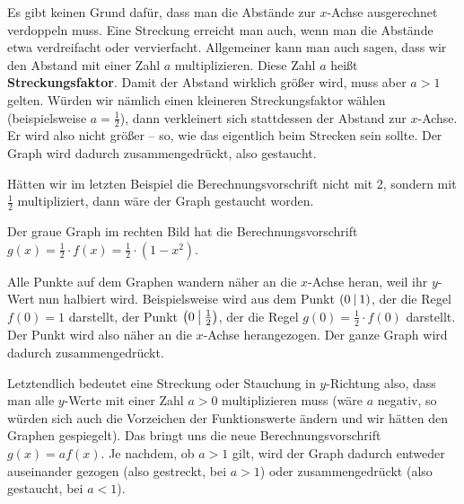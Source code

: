 \documentclass[../../main.tex]{subfiles}
\begin{document}
Es gibt keinen Grund dafür, dass man die Abstände zur $x$-Achse ausgerechnet verdoppeln muss. Eine Streckung erreicht man auch, wenn man die Abstände etwa verdreifacht oder vervierfacht. Allgemeiner kann man auch sagen, dass wir den Abstand mit einer Zahl $a$ multiplizieren. Diese Zahl $a$ heißt \textbf{Streckungsfaktor}. Damit der Abstand wirklich größer wird, muss aber $a>1$ gelten. Würden wir nämlich einen kleineren Streckungsfaktor wählen (beispielsweise $a=\frac{1}{2}$), dann verkleinert sich stattdessen der Abstand zur $x$-Achse. Er wird also nicht größer -- so, wie das eigentlich beim Strecken sein sollte. Der Graph wird dadurch zusammengedrückt, also gestaucht.

\begin{example}{}
    
    Hätten wir im letzten Beispiel die Berechnungsvorschrift nicht mit 2, sondern mit $\frac{1}{2}$ multipliziert, dann wäre der Graph gestaucht worden.
    
    Der graue Graph im rechten Bild hat die Berechnungsvorschrift $g(x)=\frac{1}{2}\cdot f(x)=\frac{1}{2}\cdot (1-x^2)$.
    
    Alle Punkte auf dem Graphen wandern näher an die $x$-Achse heran, weil ihr $y$-Wert nun halbiert wird. 
    Beispielsweise wird aus dem Punkt $\left(0 \:\middle|\: 1\right)$, der die Regel $f(0)=1$ darstellt, der Punkt $\left(0 \:\middle|\: \frac{1}{2}\right)$, der die Regel $g(0)=\frac{1}{2}\cdot f(0)$ darstellt. Der Punkt wird also näher an die $x$-Achse herangezogen. Der ganze Graph wird dadurch zusammengedrückt.
\end{example}

Letztendlich bedeutet eine Streckung oder Stauchung in $y$-Richtung also, dass man alle $y$-Werte mit einer Zahl $a>0$ multiplizieren muss (wäre $a$ negativ, so würden sich auch die Vorzeichen der Funktionswerte ändern und wir hätten den Graphen gespiegelt). Das bringt uns die neue Berechnungsvorschrift $g(x)=af(x)$. Je nachdem, ob $a>1$ gilt, wird der Graph dadurch entweder auseinander gezogen (also gestreckt, bei $a>1$) oder zusammengedrückt (also gestaucht, bei $a<1$).
\end{document}
